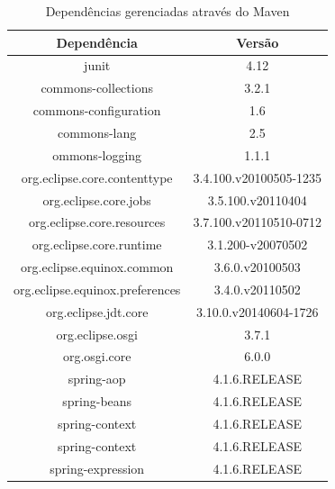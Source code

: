 \begin{table}[ht]
	\centering
	\caption{Dependências gerenciadas através do Maven}
		\label{tab:DependenciasMaven}
		\begin{tabular}{c|c}%
			\hline \hline
			\textbf{Dependência}    &   \textbf{Versão}\\ \hline
			junit 			    	&	4.12 \\ \hline
			commons-collections 	&	3.2.1 \\ \hline
			commons-configuration 	&	1.6 \\ \hline
			commons-lang 	    	&	2.5 \\ \hline
			ommons-logging 			&	1.1.1 \\ \hline
			org.eclipse.core.contenttype & 3.4.100.v20100505-1235 \\ \hline
			org.eclipse.core.jobs 		&	3.5.100.v20110404 \\ \hline
			org.eclipse.core.resources  &	3.7.100.v20110510-0712 \\ \hline
			org.eclipse.core.runtime		&	3.1.200-v20070502 \\ \hline
			org.eclipse.equinox.common		&	3.6.0.v20100503 \\ \hline
			org.eclipse.equinox.preferences &	3.4.0.v20110502 \\ \hline
			org.eclipse.jdt.core 			&	3.10.0.v20140604-1726 \\ \hline
			org.eclipse.osgi 	&	3.7.1 \\ \hline
			org.osgi.core 		&	6.0.0 \\ \hline
			spring-aop 	    	&	4.1.6.RELEASE \\ \hline
			spring-beans 		&	4.1.6.RELEASE \\ \hline
			spring-context 		&	4.1.6.RELEASE \\ \hline
			spring-context 		&	4.1.6.RELEASE \\ \hline 		
			spring-expression 	&	4.1.6.RELEASE \\ \hline
		\end{tabular}
	
\end{table}



